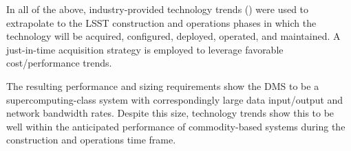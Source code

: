 In all of the above, industry-provided technology trends ()
were used to extrapolate to the LSST construction and operations phases in
which the technology will be acquired, configured, deployed, operated, and
maintained. A just-in-time acquisition strategy is employed to leverage
favorable cost/performance trends. 

The resulting performance and sizing requirements show the DMS to be a
supercomputing­-class system with correspondingly large data input/output and
network bandwidth rates.  Despite this size, technology trends show this to be
well within the anticipated performance of commodity-based systems during the
construction and operations time frame.


